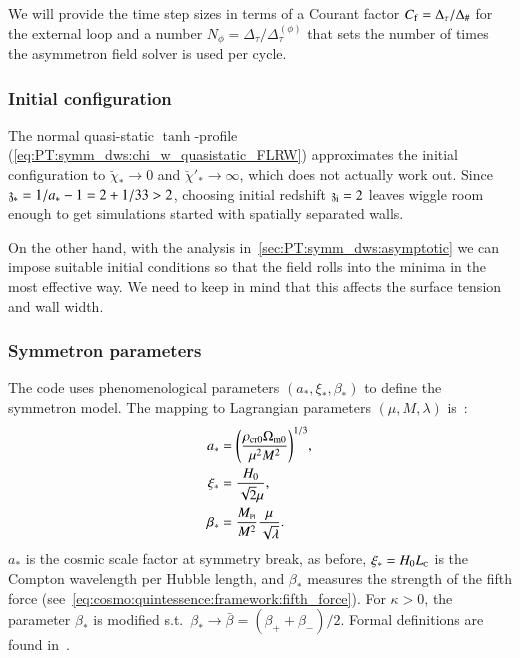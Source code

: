     We will provide the time step sizes %
    in terms of a Courant factor $C_\mathrm{f}=\Delta_\tau/\Delta_\#$ for the external loop and a number $N_\phi=\Delta_\tau/\Delta_\tau^{(\phi)}$ that sets the number of times the asymmetron field solver is used per cycle. 

\subsubsection{Initial configuration}

    The normal quasi-static $\tanh$-profile (\cref{eq:PT:symm_dws:chi_w_quasistatic_FLRW}) approximates the initial configuration to $\breve{\chi}_\ast\to0$ and $\breve{\chi}'_\ast \to \infty$, which does not actually work out. %
    Since $\mathfrak{z}_\ast=1/a_\ast-1 = 2 + 1/33> 2$, choosing initial redshift $\mathfrak{z}_\mathrm{i}=2$ leaves wiggle room enough to get simulations started with spatially separated walls.
    
    On the other hand, with the analysis in~\cref{sec:PT:symm_dws:asymptotic} we can impose suitable initial conditions so that the field rolls into the minima in the most effective way. We need to keep in mind that this affects the surface tension and wall width.



\subsubsection{Symmetron parameters}
    The code uses phenomenological parameters $(a_\ast, \xi_\ast, \beta_\ast)$ to define the symmetron model. The mapping to Lagrangian parameters $(\mu, M, \lambda)$ is~\citep{christiansenAsevolutionRelativisticNbody2023}:
    \begin{subequations}\label{eq:PT:sims:mapping_symmetron_params}
        \begin{align}
            a_\ast &=  {\left( \frac{\rho_\mathrm{cr0} \Omega_\mathrm{m0}}{\mu^2 M^2} \right)}^{1/3},\\
            \xi_\ast &= \frac{H_0}{\sqrt{2}\mu}, \\
            \beta_\ast &=\frac{M_{\text{\tiny{Pl}}}}{M^2} \frac{\mu}{\sqrt{\lambda}}.
        \end{align}
    \end{subequations}
    $a_\ast$ is the cosmic scale factor at symmetry break, as before, $\xi_\ast= H_0 L_{\text{\tiny{C}}}$ is the Compton wavelength per Hubble length, and $\beta_\ast$ measures the strength of the fifth force (see~\cref{eq:cosmo:quintessence:framework:fifth_force}). %
    For $\kappa>0$, the parameter $\beta_\ast$ is modified s.t.~$\beta_\ast \to \bar{\beta}= (\beta_+ + \beta_-)/2$. Formal definitions are found in~\citet{christiansenAsevolutionRelativisticNbody2023}. %



